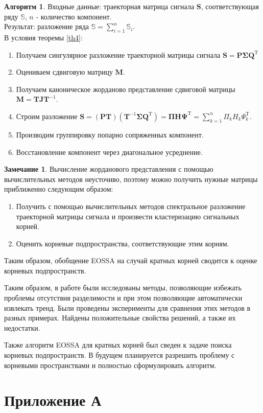 \documentclass[specialist, substylefile = spbureport.rtx, subf,href,colorlinks=true, 12pt]{disser}
\theoremstyle{definition}
\newtheorem{algorithm}{Алгоритм}
\newtheorem{remark}{Замечание}
\begin{document}
\begin{algorithm}
Входные данные: траекторная матрица сигнала $\mathbf{S}$, соответствующая ряду $\mathbb{S}$, $n$ - количество компонент.\\
Результат: разложение ряда $\mathbb{S} = \sum_{i = 1}^{n}\mathbb{S}_i$.\\
 В условия теоремы \ref{th4}:
\begin{enumerate}
            \item Получаем сингулярное разложение траекторной матрицы сигнала $\mathbf{S} = \mathbf{P\Sigma Q}^{\mathrm{T}}$
            \item Оцениваем сдвиговую матрицу $\mathbf{M}$.
            \item Получаем каноническое жорданово представление сдвиговой матрицы $\mathbf{M} = \mathbf{TJ}\mathbf{T}^{-1}$.
            \item Строим разложение $\mathbf{S} = (\mathbf{PT})(\mathbf{T}^{-1}\mathbf{\Sigma Q}^{\mathrm{T}}) = \mathbf{\Pi H \Psi}^{\mathrm{T}} = \sum_{k = 1}^{n}\Pi_k H_k\Psi^{\mathrm{T}}_k$.
            \item Производим группировку попарно сопряженных компонент.
            \item Восстановление компонент через диагональное усреднение. 
        \end{enumerate}
\end{algorithm}

\begin{remark}
 Вычисление жорданового представления с помощью вычислительных методов неусточиво, поэтому можно получить нужные матрицы приближенно следующим образом:
 \begin{enumerate}
     \item Получить с помощью вычислительных методов спектральное разложение траекторной матрицы сигнала и произвести кластеризацию сигнальных корней.
     \item Оценить корневые подпространства, соответствующие этим корням.
 \end{enumerate}
 Таким образом, обобщение EOSSA на случай кратных корней сводится к оценке корневых подпространств.
\end{remark}

\conclusion

Таким образом, в работе были исследованы методы, позволяющие избежать проблемы отсутствия разделимости и при этом позволяющие автоматически извлекать тренд. Были проведены эксперименты для сравнения этих методов в разных примерах. Найдены положительные свойства решений, а также их недостатки.

Также алгоритм EOSSA для кратных корней был сведен к задаче поиска корневых подпространств. В будущем планируется разрешить проблему с корневыми пространствами и полностью сформулировать алгоритм.





\chapter{Приложение А}
\end{document}
